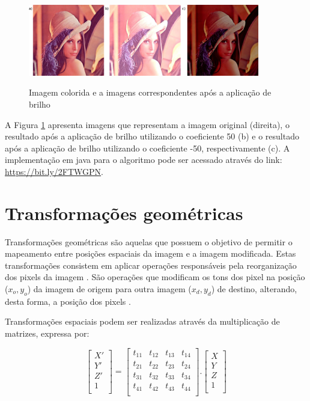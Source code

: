 \documentclass[
	12pt,				%
	oneside,			%
	a4paper,			%
	english,			%
	french,				%
	spanish,			%
	brazil,				%
	]{abntex2}
\begin{document}
\begin{figure}[ht]
\centering
\caption{Imagem colorida e a imagens correspondentes após a aplicação de brilho}
\includegraphics[width=0.9\textwidth]{imagens/brilho.png}
\sourceAuthor
\label{fig:brilho}
\end{figure}

A Figura \ref{fig:brilho} apresenta imagens que representam a imagem original (direita), o resultado após a aplicação de brilho utilizando o coeficiente 50 (b) e o resultado após a aplicação de brilho utilizando o coeficiente -50, respectivamente (c). A implementação em java para o algoritmo pode ser acessado através do link: \url{https://bit.ly/2FTWGPN}.

\section{Transformações geométricas}

Transformações geométricas são aquelas que possuem o objetivo de permitir o mapeamento entre posições espaciais da imagem e a imagem modificada. Estas transformações consistem em aplicar operações responsáveis pela reorganização dos pixels da imagem \cite{pedriniSchwartz:2008}. São operações que modificam os tons dos pixel na posição (\(x_o, y_o\)) da imagem de origem para outra imagem (\(x_d, y_d\)) de destino, alterando, desta forma, a posição dos pixels \cite{conciAzevedoLeta:2008}.

Transformações espaciais podem ser realizadas através da multiplicação de matrizes, expressa por:

\[
\begin{bmatrix}
    X'       \\ 
	Y'       \\ 
	Z'       \\ 
    1        \\ 
\end{bmatrix}
=
\begin{bmatrix}
    t_{11} & t_{12} & t_{13} & t_{14}   \\ 
	t_{21} & t_{22} & t_{23} & t_{24}   \\ 
	t_{31} & t_{32} & t_{33} & t_{34}   \\ 
	t_{41} & t_{42} & t_{43} & t_{44}   \\ 
\end{bmatrix}
.
\begin{bmatrix}
    X       \\ 
	Y       \\ 
	Z       \\ 
    1       \\ 
\end{bmatrix}
\]
\end{document}
